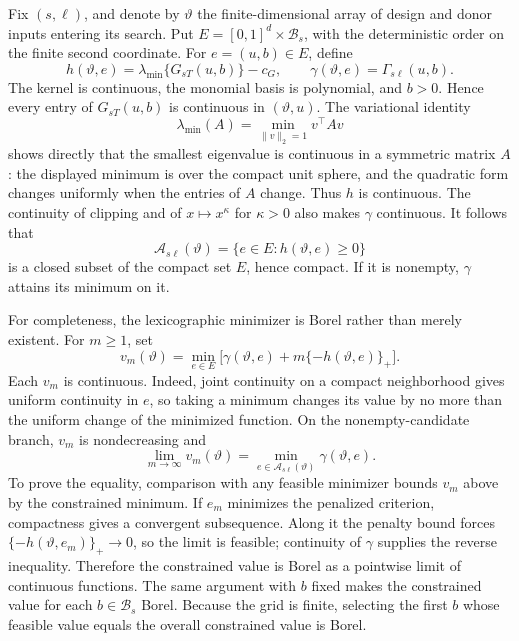 Fix \((s,\ell)\), and denote by \(\vartheta\) the finite-dimensional array of design and donor inputs entering its search.  Put \(E=[0,1]^d\times\mathcal B_s\), with the deterministic order on the finite second coordinate.  For \(e=(u,b)\in E\), define
\[
 h(\vartheta,e)=\lambda_{\min}\{G_{sT}(u,b)\}-c_G,
 \qquad
 \gamma(\vartheta,e)=\Gamma_{s\ell}(u,b).
\]
The kernel is continuous, the monomial basis is polynomial, and \(b>0\).  Hence every entry of \(G_{sT}(u,b)\) is continuous in \((\vartheta,u)\).  The variational identity
\[
 \lambda_{\min}(A)=\min_{\|v\|_2=1}v^\top Av
\]
shows directly that the smallest eigenvalue is continuous in a symmetric matrix \(A\): the displayed minimum is over the compact unit sphere, and the quadratic form changes uniformly when the entries of \(A\) change.  Thus \(h\) is continuous.  The continuity of clipping and of \(x\mapsto x^\kappa\) for \(\kappa>0\) also makes \(\gamma\) continuous.  It follows that
\[
 \mathcal A_{s\ell}(\vartheta)=\{e\in E:h(\vartheta,e)\ge0\}
\]
is a closed subset of the compact set \(E\), hence compact.  If it is nonempty, \(\gamma\) attains its minimum on it.

For completeness, the lexicographic minimizer is Borel rather than merely existent.  For \(m\ge1\), set
\[
 v_m(\vartheta)=\min_{e\in E}
 \bigl[\gamma(\vartheta,e)+m\{-h(\vartheta,e)\}_+\bigr].
\]
Each \(v_m\) is continuous.  Indeed, joint continuity on a compact neighborhood gives uniform continuity in \(e\), so taking a minimum changes its value by no more than the uniform change of the minimized function.  On the nonempty-candidate branch, \(v_m\) is nondecreasing and
\[
 \lim_{m\to\infty}v_m(\vartheta)
 =\min_{e\in\mathcal A_{s\ell}(\vartheta)}\gamma(\vartheta,e).
\]
To prove the equality, comparison with any feasible minimizer bounds \(v_m\) above by the constrained minimum.  If \(e_m\) minimizes the penalized criterion, compactness gives a convergent subsequence.  Along it the penalty bound forces \(\{-h(\vartheta,e_m)\}_+\to0\), so the limit is feasible; continuity of \(\gamma\) supplies the reverse inequality.  Therefore the constrained value is Borel as a pointwise limit of continuous functions.  The same argument with \(b\) fixed makes the constrained value for each \(b\in\mathcal B_s\) Borel.  Because the grid is finite, selecting the first \(b\) whose feasible value equals the overall constrained value is Borel.

